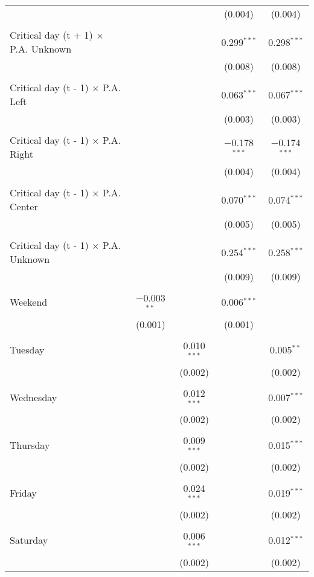\documentclass[
]{article}
\begin{document}
\begin{table}[!htbp]
{\begin{tabular}{@{\extracolsep{5pt}}lcccc}
  &  &  & (0.004) & (0.004) \\ 
  & & & & \\ 
 Critical day (t + 1) $\times$ P.A. Unknown &  &  & 0.299$^{***}$ & 0.298$^{***}$ \\ 
  &  &  & (0.008) & (0.008) \\ 
  & & & & \\ 
 Critical day (t - 1) $\times$ P.A. Left &  &  & 0.063$^{***}$ & 0.067$^{***}$ \\ 
  &  &  & (0.003) & (0.003) \\ 
  & & & & \\ 
 Critical day (t - 1) $\times$ P.A. Right &  &  & $-$0.178$^{***}$ & $-$0.174$^{***}$ \\ 
  &  &  & (0.004) & (0.004) \\ 
  & & & & \\ 
 Critical day (t - 1) $\times$ P.A. Center &  &  & 0.070$^{***}$ & 0.074$^{***}$ \\ 
  &  &  & (0.005) & (0.005) \\ 
  & & & & \\ 
 Critical day (t - 1) $\times$ P.A. Unknown &  &  & 0.254$^{***}$ & 0.258$^{***}$ \\ 
  &  &  & (0.009) & (0.009) \\ 
  & & & & \\ 
 Weekend & $-$0.003$^{**}$ &  & 0.006$^{***}$ &  \\ 
  & (0.001) &  & (0.001) &  \\ 
  & & & & \\ 
 Tuesday &  & 0.010$^{***}$ &  & 0.005$^{**}$ \\ 
  &  & (0.002) &  & (0.002) \\ 
  & & & & \\ 
 Wednesday &  & 0.012$^{***}$ &  & 0.007$^{***}$ \\ 
  &  & (0.002) &  & (0.002) \\ 
  & & & & \\ 
 Thursday &  & 0.009$^{***}$ &  & 0.015$^{***}$ \\ 
  &  & (0.002) &  & (0.002) \\ 
  & & & & \\ 
 Friday &  & 0.024$^{***}$ &  & 0.019$^{***}$ \\ 
  &  & (0.002) &  & (0.002) \\ 
  & & & & \\ 
 Saturday &  & 0.006$^{***}$ &  & 0.012$^{***}$ \\ 
  &  & (0.002) &  & (0.002) \\ 

\end{tabular}}
\end{table}
\end{document}
